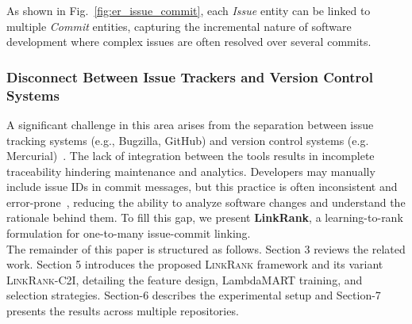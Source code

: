 As shown in Fig.~\ref{fig:er_issue_commit}, each \textit{Issue} entity can be linked to multiple \textit{Commit} entities, capturing the incremental nature of software development where complex issues are often resolved over several commits.


\subsubsection*{Disconnect Between Issue Trackers and Version Control Systems}

A significant challenge in this area arises from the separation between issue tracking systems (e.g., Bugzilla, GitHub) and version control systems (e.g. Mercurial)~\cite{r1,r2}. The lack of integration between the tools results in incomplete traceability hindering maintenance and analytics. Developers may manually include issue IDs in commit messages, but this practice is often inconsistent and error-prone~\cite{r16,r18}, reducing the ability to analyze software changes and understand the rationale behind them. To fill this gap, we present \textbf{LinkRank}, a learning-to-rank formulation for one-to-many issue-commit linking.\\

\noindent
The remainder of this paper is structured as follows. Section 3 reviews the related work. Section 5 introduces the proposed \textsc{LinkRank} framework and its variant \textsc{LinkRank-C2I}, detailing the feature design, LambdaMART training, and selection strategies. Section-6 describes the experimental setup and Section-7 presents the results across multiple repositories.

% 
% 
